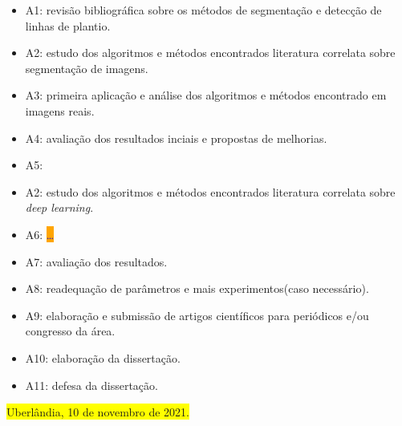 \documentclass[12pt, a4paper, english, brazil]{article}
\newcommand{\dotsBlue}{\colorbox{orange}{\textcolor{blue}{\dots}}}
\newcommand{\boxYellow}[1]{\colorbox{yellow}{#1}}
\begin{document}
\begin{itemize}
    \item A1: revisão bibliográfica sobre os métodos de segmentação e detecção de linhas de plantio.
    \item A2: estudo dos algoritmos e métodos encontrados literatura correlata sobre segmentação de imagens.
    \item A3: primeira aplicação e análise dos algoritmos e métodos encontrado em imagens reais.
    \item A4: avaliação dos resultados inciais e propostas de melhorias.
    \item A5: \item A2: estudo dos algoritmos e métodos encontrados literatura correlata sobre \textit{deep learning}.
    \item A6: \dotsBlue
    \item A7: avaliação dos resultados.
    \item A8: readequação de parâmetros e mais experimentos(caso necessário).
    \item A9: elaboração e submissão de artigos científicos para periódicos e/ou congresso da área.
    \item A10: elaboração da dissertação.
    \item A11: defesa da dissertação.
\end{itemize}



\bigskip
\noindent \boxYellow{Uberlândia, 10 de novembro de 2021.}


\end{document}
